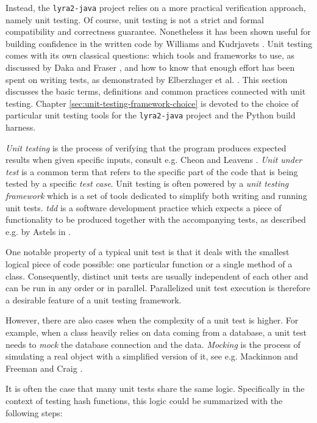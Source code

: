 Instead, the \texttt{lyra2-java} project relies on a more practical verification approach, namely unit testing. Of course, unit testing is not a strict and formal compatibility and correctness guarantee. Nonetheless it has been shown useful for building confidence in the written code by Williams and Kudrjavets \cite{williams:2010:unit-tests-rock}. Unit testing comes with its own classical questions: which tools and frameworks to use, as discussed by Daka and Fraser \cite{daka:2014:unit-testing-tools}, and how to know that enough effort has been spent on writing tests, as demonstrated by Elberzhager et al. \cite{elberzhager:2012:reducing-effort}. This section discusses the basic terms, definitions and common practices connected with unit testing. Chapter \ref{sec:unit-testing-framework-choice} is devoted to the choice of particular unit testing tools for the \texttt{lyra2-java} project and the Python build harness.

\emph{Unit testing} is the process of verifying that the program produces expected results when given specific inputs, consult e.g. Cheon and Leavens \cite{cheon2002simple}. \emph{Unit under test} is a common term that refers to the specific part of the code that is being tested by a specific \emph{test case}. Unit testing is often powered by a \emph{unit testing framework} which is a set of tools dedicated to simplify both writing and running unit tests. \emph{\Gls{tdd}} is a software development practice which expects a piece of functionality to be produced together with the accompanying tests, as described e.g. by Astels in \cite{Astels:2003:TDD:864016}.

One notable property of a typical unit test is that it deals with the smallest logical piece of code possible: one particular function or a single method of a class. Consequently, distinct unit tests are usually independent of each other and can be run in any order or in parallel. Parallelized unit test execution is therefore a desirable feature of a unit testing framework.

However, there are also cases when the complexity of a unit test is higher. For example, when a class heavily relies on data coming from a database, a unit test needs to \emph{mock} the database connection and the data. \emph{Mocking} is the process of simulating a real object with a simplified version of it, see e.g. Mackinnon and Freeman and Craig \cite{mackinnon:2001:endo-testing}.

It is often the case that many unit tests share the same logic. Specifically in the context of testing hash functions, this logic could be summarized with the following steps:

